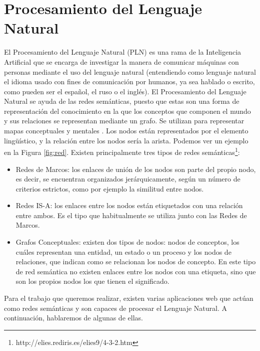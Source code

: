 \section{Procesamiento del Lenguaje Natural}
\label{cap:sec:lenguajenatural}
El Procesamiento del Lenguaje Natural (PLN) es una rama de la Inteligencia Artificial que se encarga de investigar la manera de comunicar máquinas con personas mediante el uso del lenguaje natural (entendiendo como lenguaje natural el idioma usado con fines de comunicación por humanos, ya sea hablado o escrito, como pueden ser el español, el ruso o el inglés). 
El Procesamiento del Lenguaje Natural se ayuda de las redes semánticas, puesto que estas son una forma de representación del conocimiento en la que los conceptos que componen el mundo y sus relaciones se representan mediante un grafo. Se utilizan para representar mapas conceptuales y mentales \citep{wiki:redSemantica2018}.
Los nodos están representados por el elemento lingüístico, y  la relación entre los nodos sería la arista. Podemos ver un ejemplo en la Figura \ref{fig:red}.
Existen principalmente tres tipos de redes semánticas\footnote{http://elies.rediris.es/elies9/4-3-2.htm}:
\begin{itemize}
	\item Redes de Marcos: los enlaces de unión de los nodos son parte del propio nodo, es decir, se encuentran organizados jerárquicamente, según un número de criterios estrictos, como por ejemplo la similitud entre nodos.
	\item Redes IS-A: los enlaces entre los nodos están etiquetados con una relación entre ambos. Es el tipo que habitualmente se utiliza junto con las Redes de Marcos.
	\item Grafos Conceptuales: existen dos tipos de nodos: nodos de conceptos, los cuáles representan una entidad, un estado o un proceso y los nodos de relaciones, que indican como se relacionan los nodos de concepto. En este tipo de red semántica no existen enlaces entre los nodos con una etiqueta, sino que son los propios nodos los que tienen el significado. 
\end{itemize}

Para el trabajo que queremos realizar, existen varias aplicaciones web que actúan como redes semánticas y son capaces de procesar el Lenguaje Natural.  A continuación, hablaremos de algunas de ellas.

